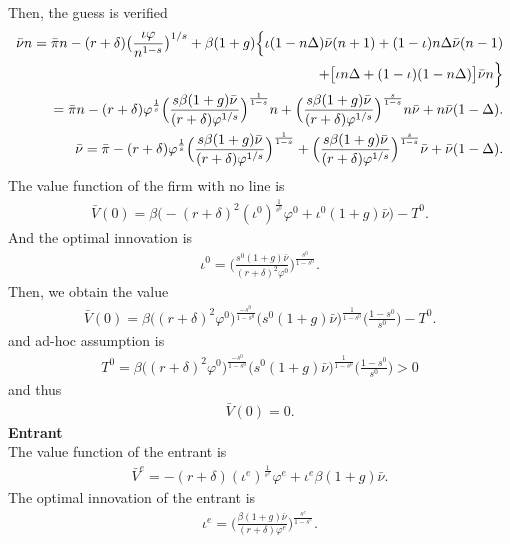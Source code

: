 \documentclass[a4paper,12pt]{article}
\begin{document}
Then, the guess is verified
\begin{align}
    \bar{\nu} n = \bar{\pi}n - (r+\delta)\big(\frac{\iota\varphi}{n^{1-s}}\big)^{1/s} + \beta (1+g)\Big\{\iota (1-n\Delta)\bar{\nu} (n+1) + (1-\iota)n\Delta \bar{\nu} (n-1) \notag\\ 
    + \big[\iota n\Delta+(1-\iota)(1-n\Delta)\big]\bar\nu n \Big\}\notag\\
    = \bar{\pi}n -(r+\delta) \varphi^\frac{1}{s}\Big(\frac{s\beta (1+g)\bar\nu}{(r+\delta)\varphi^{1/s}}\Big)^\frac{1}{1-s}n + \Big(\frac{s\beta (1+g)\bar\nu}{(r+\delta)\varphi^{1/s}}\Big)^\frac{s}{1-s}n \bar{\nu} + n\bar{\nu}(1-\Delta).\\
    \bar{\nu} = \bar{\pi} -(r+\delta) \varphi^\frac{1}{s}\Big(\frac{s\beta (1+g)\bar\nu}{(r+\delta)\varphi^{1/s}}\Big)^\frac{1}{1-s} + \Big(\frac{s\beta (1+g)\bar\nu}{(r+\delta)\varphi^{1/s}}\Big)^\frac{s}{1-s} \bar{\nu} + \bar{\nu}(1-\Delta).
\end{align}
The value function of the firm with no line is 
\begin{align}
    \bar{V}(0) = \beta\Big(-(r+\delta)^2 (\iota^0)^\frac{1}{s^0}\varphi^0 + \iota^0(1+g)\bar\nu\Big) - T^0.
\end{align}
And the optimal innovation is 
\begin{align}
    \iota^0 = \Big(\frac{s^0(1+g)\bar \nu}{(r+\delta)^2\varphi^0}\Big)^\frac{s^0}{1-s^0}.
\end{align}
Then, we obtain the value
\begin{align}
    \bar{V}(0) = \beta \big((r+\delta)^2\varphi^0\big)^\frac{-s^0}{1-s^0} \big(s^0(1+g)\bar{\nu}\big)^\frac{1}{1-s^0} \big(\frac{1-s^0}{s^0}\big) - T^0.
\end{align}
and ad-hoc assumption is
\begin{align}
    T^0 = \beta \big((r+\delta)^2\varphi^0\big)^\frac{-s^0}{1-s^0} \big(s^0(1+g)\bar{\nu}\big)^\frac{1}{1-s^0} \big(\frac{1-s^0}{s^0}\big) >0
\end{align}
and thus
\begin{align}
    \bar{V}(0) = 0.
\end{align}
\textbf{Entrant}\\
The value function of the entrant is 
\begin{align}
    \bar{V}^e = -(r+\delta)(\iota^e)^\frac{1}{s^e}\varphi^e + \iota^e \beta (1+g) \bar \nu.
\end{align}
The optimal innovation of the entrant is
\begin{align}
    \iota^e = \Big(\frac{\beta (1+g)\bar \nu}{(r+\delta)\varphi^e}\Big)^\frac{s^e}{1-s^e}.
\end{align}
\end{document}
